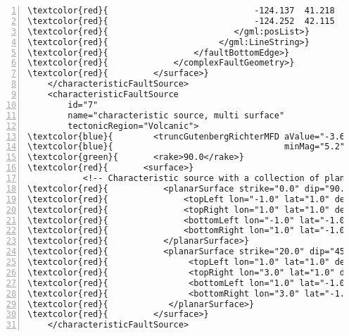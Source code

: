 \begin{Verbatim}[frame=single, commandchars=\\\{\}, fontsize=\footnotesize,
    numbers=left, numbersep=2pt]
\textcolor{red}{                             -124.137  41.218  0.1741390E+02}
\textcolor{red}{                             -124.252  42.115  0.1752740E+02}
\textcolor{red}{                         </gml:posList>}
\textcolor{red}{                      </gml:LineString>}
\textcolor{red}{                 </faultBottomEdge>}
\textcolor{red}{             </complexFaultGeometry>}
\textcolor{red}{         </surface>}
    </characteristicFaultSource>
    <characteristicFaultSource
        id="7"
        name="characteristic source, multi surface"
        tectonicRegion="Volcanic">
\textcolor{blue}{        <truncGutenbergRichterMFD aValue="-3.6" bValue="1.0"}
\textcolor{blue}{                                  minMag="5.2" maxMag="6.4" />}
\textcolor{green}{       <rake>90.0</rake>}
\textcolor{red}{       <surface>}
           <!-- Characteristic source with a collection of planar surfaces -->
\textcolor{red}{           <planarSurface strike="0.0" dip="90.0">}
\textcolor{red}{               <topLeft lon="-1.0" lat="1.0" depth="21.0" />}
\textcolor{red}{               <topRight lon="1.0" lat="1.0" depth="21.0" />}
\textcolor{red}{               <bottomLeft lon="-1.0" lat="-1.0" depth="59.0" />}
\textcolor{red}{               <bottomRight lon="1.0" lat="-1.0" depth="59.0" />}
\textcolor{red}{           </planarSurface>}
\textcolor{red}{           <planarSurface strike="20.0" dip="45.0">}
\textcolor{red}{                <topLeft lon="1.0" lat="1.0" depth="20.0" />}
\textcolor{red}{                <topRight lon="3.0" lat="1.0" depth="20.0" />}
\textcolor{red}{                <bottomLeft lon="1.0" lat="-1.0" depth="80.0" />}
\textcolor{red}{                <bottomRight lon="3.0" lat="-1.0" depth="80.0" />}
\textcolor{red}{            </planarSurface>}
\textcolor{red}{         </surface>}
    </characteristicFaultSource>
\end{Verbatim}

